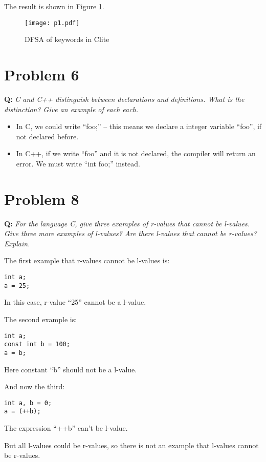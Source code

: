 \documentclass{article}
\begin{document}
The result is shown in Figure \ref{p1}.

\begin{figure}[hp]
\begin{center}
\texttt{[image: p1.pdf]}
\caption{DFSA of keywords in Clite}
\label{p1}
\end{center}
\end{figure}

\section*{Problem 6}
\textbf{Q:} \textit{C and C++ distinguish between declarations and definitions. What is the distinction? Give an example of each each.}

\begin{itemize}
\item In C, we could write ``foo;'' -- this means we declare a integer variable ``foo'', if not declared before.
\item In C++, if we write ``foo'' and it is not declared, the compiler will return an error. We must write ``int foo;'' instead.
\end{itemize}

\section*{Problem 8}
\textbf{Q:} \textit{For the language C, give three examples of r-values that cannot be l-values. Give three more examples of l-values? Are there l-values that cannot be r-values? Explain.}

The first example that r-values cannot be l-values is:
\begin{lstlisting}
int a;
a = 25;
\end{lstlisting}

In this case, r-value ``25'' cannot be a l-value.

The second example is:
\begin{lstlisting}
int a;
const int b = 100;
a = b;
\end{lstlisting}

Here constant ``b'' should not be a l-value.

And now the third:
\begin{lstlisting}
int a, b = 0;
a = (++b);
\end{lstlisting}

The expression ``++b'' can't be l-value.

But all l-values could be r-values, so there is not an example that l-values cannot be r-values.
\end{document}
